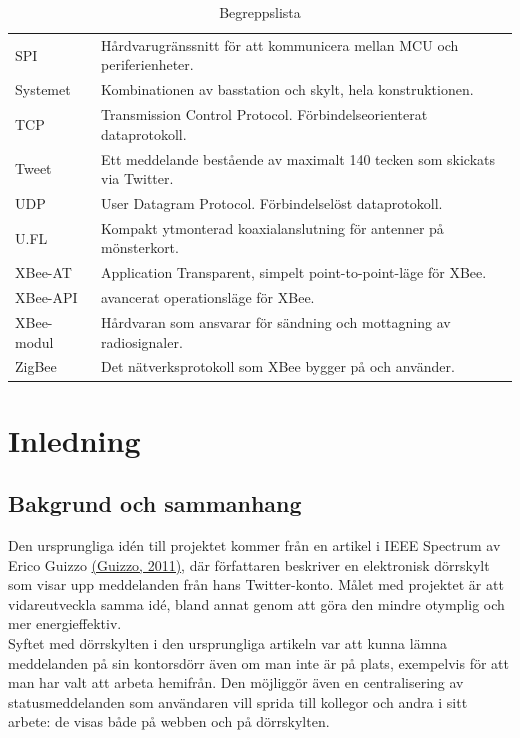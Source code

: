 \documentclass[a4paper,11pt]{article}
\begin{document}
\begin{table}[h!]
\begin{tabular}{|l|l|}
SPI & Hårdvarugränssnitt för att kommunicera mellan MCU och periferienheter.\\
Systemet & Kombinationen av basstation och skylt, hela konstruktionen.\\
TCP & Transmission Control Protocol. Förbindelseorienterat dataprotokoll.\\
Tweet & Ett meddelande bestående av maximalt 140 tecken som skickats via Twitter.\\
UDP & User Datagram Protocol. Förbindelselöst dataprotokoll.\\
U.FL & Kompakt ytmonterad koaxialanslutning för antenner på mönsterkort.\\
XBee-AT & Application Transparent, simpelt point-to-point-läge för XBee.\\
XBee-API & avancerat operationsläge för XBee.\\
XBee-modul & Hårdvaran som ansvarar för sändning och mottagning av radiosignaler.\\
ZigBee & Det nätverksprotokoll som XBee bygger på och använder.\\
	\end{tabular}
\caption{Begreppslista}
\label{tab:begreppstable}
\end{table}

\thispagestyle{empty}
\pagebreak

\thispagestyle{empty}
\tableofcontents
\thispagestyle{empty}
\pagebreak

\setcounter{page}{1}
\section{Inledning}

\subsection{Bakgrund och sammanhang}
Den ursprungliga idén till projektet kommer från en artikel i IEEE Spectrum av Erico Guizzo \hyperref[spectrum]{(Guizzo, 2011)}, där författaren beskriver en elektronisk dörrskylt som visar upp meddelanden från hans Twitter-konto. Målet med projektet är att vidareutveckla samma idé, bland annat genom att göra den mindre otymplig och mer energieffektiv. \\

Syftet med dörrskylten i den ursprungliga artikeln var att kunna lämna meddelanden på sin kontorsdörr även om man inte är på plats, exempelvis för att man har valt att arbeta hemifrån. Den möjliggör även en centralisering av statusmeddelanden som användaren vill sprida till kollegor och andra i sitt arbete: de visas både på webben och på dörrskylten.\\
\end{document}
